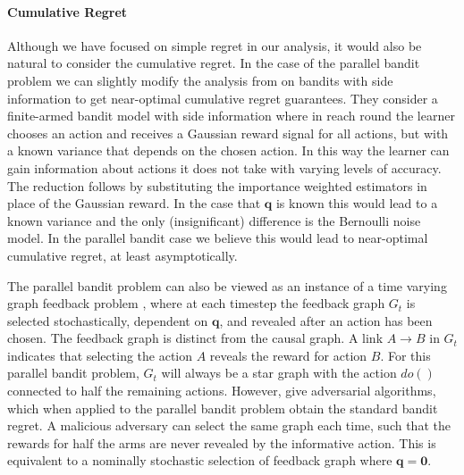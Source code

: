 \documentclass[11pt,a4paper,twoside]{report}
\renewcommand{\vec}[1]{\boldsymbol{#1}}
\theoremstyle{plain}
\theoremstyle{definition}
\begin{document}
\paragraph{Cumulative Regret}
Although we have focused on simple regret in our analysis, it would also be natural to consider the cumulative regret. In the case of the parallel bandit problem we can slightly modify the analysis from \citep{wu2015online} on bandits with side information 
to get near-optimal cumulative regret guarantees. They consider a finite-armed bandit model with side information where in reach round the learner chooses an action and receives a Gaussian reward signal for all actions, but with a known variance that depends on the chosen action. In this way the learner can gain information about actions it does not take with varying levels of accuracy. The reduction follows by substituting the importance weighted estimators in place of the Gaussian reward. In the case that $\vec{q}$ is known this would lead to a known variance and the only (insignificant) difference is the Bernoulli noise model. In the parallel bandit case we believe this would lead to near-optimal cumulative regret,
at least asymptotically. 


The parallel bandit problem can also be viewed as an instance of a time varying graph feedback problem \citep{Alon2015,Kocak2014}, where at each timestep the feedback graph $G_t$ is selected stochastically, dependent on $\boldsymbol{q}$, and revealed after an action has been chosen. The feedback graph is distinct from the causal graph. A link $A \rightarrow B$ in $G_t$ indicates that selecting the action $A$ reveals the reward for action $B$. For this parallel bandit problem, $G_t$ will always be a star graph with the action $do()$ connected to half the remaining actions. However, \citet{Alon2015,Kocak2014} give adversarial algorithms, which when applied to the parallel bandit problem obtain the standard bandit regret. A malicious adversary can select the same graph each time, such that the rewards for half the arms are never revealed by the informative action. This is equivalent to a nominally stochastic selection of feedback graph where $\boldsymbol{q} = \boldsymbol{0}$. 
\end{document}
